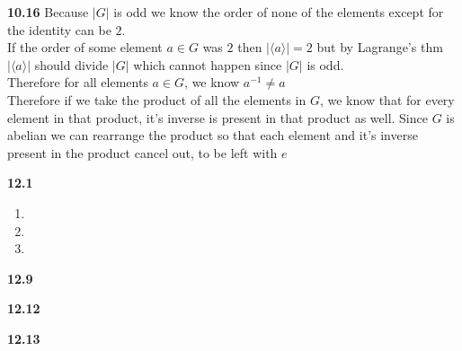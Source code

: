 \documentclass[12pt]{article}
\newenvironment{ques}{\vspace{2 ex}}{\vspace{2 ex}}
\theoremstyle{definition}
\begin{document}
\begin{ques}
	\textbf{10.16}
		Because $|G|$ is odd we know the order of none of the elements
		except for the identity can be $2$.\\
		If the order of some element $a \in G$ was $2$ then $|\langle a
		\rangle| = 2$ but by Lagrange's thm $|\langle a \rangle|$
		should divide $|G|$ which cannot happen since $|G|$ is odd.\\
		Therefore for all elements $a \in G$, we know $a^{-1} \neq a$\\
		Therefore if we take the product of all the elements in $G$, we
		know that for every element in that product, it's inverse is
		present in that product as well. Since $G$ is abelian we can
		rearrange the product so that each element and it's inverse
		present in the product cancel out, to be left with $e$
\end{ques}

\begin{ques}
	\textbf{12.1}
		\begin{enumerate}
			\item

			\item

			\item

		\end{enumerate}
\end{ques}

\begin{ques}
	\textbf{12.9} 
\end{ques}

\begin{ques} 
	\textbf{12.12} 
\end{ques}

\begin{ques} 
	\textbf{12.13} 
\end{ques}
\end{document}
